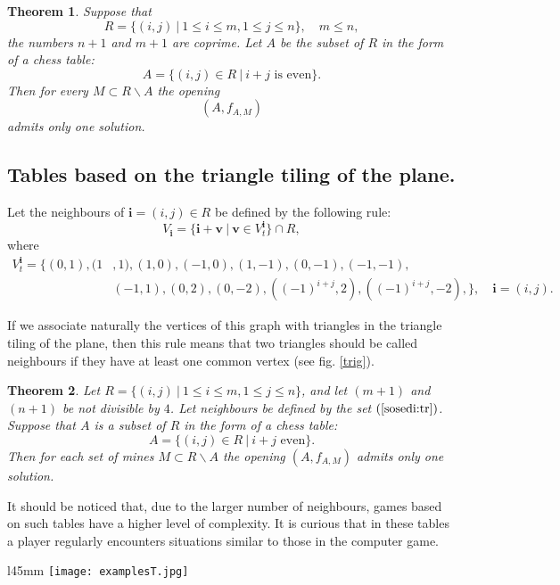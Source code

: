 \documentclass[english,12pt]{article}
\newtheorem{theorem}{Theorem}
\theoremstyle{remark}
\theoremstyle{definition}
\theoremstyle{definition}
\newcommand{\bsi}{{\boldsymbol i}}
\newcommand{\bsv}{{\boldsymbol v}}
\begin{document}
\begin{theorem} \label{t:chess}
Suppose that
\[ R=\{(i,j)\ |\ 1 \leq i\leq m, 1 \leq j \leq n \},\quad m\leq n, \]
the numbers $n+1$ and $m+1$ are coprime. Let $A$ be the subset of
$R$ in the form of a chess table:
\[ A=\{ (i,j) \in R\ |\ i+j \text{ is even}\}. \]
Then for every $M\subset R\backslash A$ the opening
\[ (A,f_{A,M}) \]
admits only one solution.
\end{theorem}


\subsection{Tables based on the triangle tiling of the plane.}


Let the neighbours of $\bsi=(i,j) \in R$ be defined by the following rule:
\[ V_\bsi = \{\bsi+\bsv\ |\ \bsv\in V^{\bsi}_t\} \cap R, \]
where
\begin{equation} \label{sosedi:tr}
  \begin{split}
    V^{\bsi}_t=\{ (0,1),(1 & ,1),(1,0),(-1,0),(1,-1),(0,-1),
    (-1,-1), \\ & (-1,1),
    (0,2),(0,-2),((-1)^{i+j},2),((-1)^{i+j},-2),\}, \quad \bsi=(i,j).
  \end{split}
\end{equation}

If we associate naturally the vertices of this graph with
triangles in the triangle tiling of the plane, then this rule
means that two triangles should be called neighbours if they have
at least one common vertex (see fig. \ref{trig}).

\begin{theorem}\label{tr}
  Let  $R=\{(i,j)\ |\ 1 \leq i\leq m, 1 \leq j \leq n \}$, and let $(m+1)$ and $(n+1)$ be not
  divisible by $4$. Let neighbours be defined by the set $(\ref{sosedi:tr})$. Suppose that $A$ is a subset of $R$
  in the form of a chess table:
  \[ A=\{ (i,j) \in R\ |\ i+j \text{ even}\}. \]
  Then for each set of mines $M\subset R\backslash A$ the opening $(A,f_{A,M})$ admits only one
  solution.
\end{theorem}

It should be noticed that, due to the larger number of neighbours, games based on such tables have
a higher level of complexity. It is curious that in these tables a player regularly encounters
situations similar to those in the computer game.

\begin{wrapfigure}{l}{45mm}
\texttt{[image: examplesT.jpg]}\label{trig}
 \caption{
Table on base of equilateral triangles.}
\end{wrapfigure}
\end{document}
